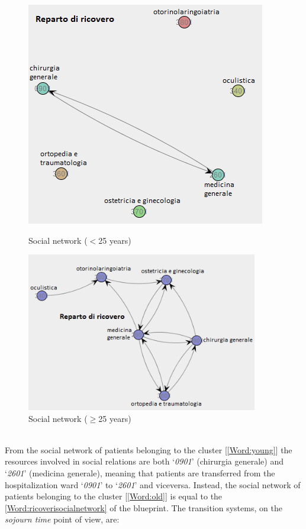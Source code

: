 \begin{figure} [htbp]
\begin{minipage}[t]{0.4\textwidth}
\includegraphics[width=\textwidth]{RicoveriSocialNetworkYoungs}
\caption{Social network ($<$25 years)}
\end{minipage}
\begin{minipage}[t]{0.6\textwidth}
\includegraphics[width=0.9\textwidth]{RicoveriSocialNetworkOlds}
\caption{Social network ($\geq$25 years)}
\end{minipage}
\end{figure}\\
From the social network of patients belonging to the cluster [\ref{Word:young}] the resources involved in social relations are both `\textit{0901}' (chirurgia generale) and `\textit{2601}' (medicina generale), meaning that patients are transferred from the hospitalization ward `\textit{0901}' to `\textit{2601}' and viceversa. Instead, the social network of patients belonging to the cluster [\ref{Word:old}] is equal to the \ref{Word:ricoverisocialnetwork} of the blueprint. The transition systems, on the \textit{sojourn time} point of view, are:
